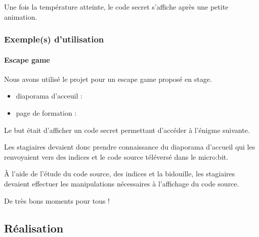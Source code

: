\documentclass[letterpaper,10pt,french]{sphinxmanual}
\begin{document}
Une fois la température atteinte, le code secret s’affiche après
une petite animation.


\subsubsection{Exemple(s) d’utilisation}
\label{\detokenize{projets/temperature:exemple-s-d-utilisation}}

\paragraph{Escape game}
\label{\detokenize{projets/temperature-exemple-escape:projettempescape}}\label{\detokenize{projets/temperature-exemple-escape:escape-game}}\label{\detokenize{projets/temperature-exemple-escape::doc}}
Nous avons utilisé le projet {\hyperref[\detokenize{projets/temperature:projettemp}]{}} pour un escape game proposé en stage.
\begin{itemize}
\item {} 
diaporama d’acceuil : 

\item {} 
page de formation : 

\end{itemize}

Le but était d’afficher un code secret permettant d’accéder
à l’énigme suivante.

\noindent{}

Les stagiaires devaient donc prendre connaissance du diaporama
d’accueil qui les renvoyaient vers des indices et le code source
téléversé dans le micro:bit.

À l’aide de l’étude du code source, des indices et la bidouille,
les stagiaires devaient effectuer les manipulations nécessaires à
l’affichage du code source.

De très bons moments pour tous !


\subsection{Réalisation}
\label{\detokenize{projets/temperature:realisation}}
\end{document}
